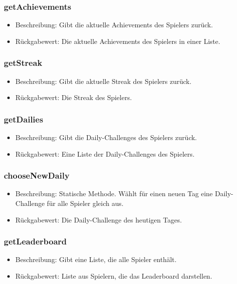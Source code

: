 \documentclass[a4paper]{scrreprt}
\begin{document}
	\subsubsection{getAchievements}
	\begin{itemize}
		\item Beschreibung: Gibt die aktuelle Achievements des Spielers zurück.
		\item Rückgabewert: Die aktuelle Achievements des Spielers in einer Liste.
	\end{itemize}
	\subsubsection{getStreak}
	\begin{itemize}
		\item Beschreibung: Gibt die aktuelle Streak des Spielers zurück.
		\item Rückgabewert: Die Streak des Spielers.
	\end{itemize}
	\subsubsection{getDailies}
	\begin{itemize}
		\item Beschreibung: Gibt die Daily-Challenges des Spielers zurück.
		\item Rückgabewert: Eine Liste der Daily-Challenges des Spielers.
	\end{itemize}
	\subsubsection{chooseNewDaily}
	\begin{itemize}
		\item Beschreibung: Statische Methode. Wählt für einen neuen Tag eine Daily-Challenge für alle Spieler gleich aus.
		\item Rückgabewert: Die Daily-Challenge des heutigen Tages.
	\end{itemize}
	\subsubsection{getLeaderboard}
	\begin{itemize}
		\item Beschreibung: Gibt eine Liste, die alle Spieler enthält.
		\item Rückgabewert: Liste aus Spielern, die das Leaderboard darstellen.
	\end{itemize}
	
\end{document}
